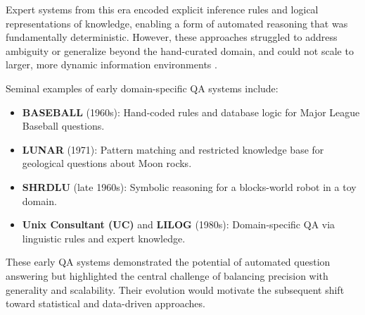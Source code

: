 \begin{spacing}{1.5}
Expert systems from this era encoded explicit inference rules and logical representations of knowledge, enabling a form of automated reasoning that was fundamentally deterministic. However, these approaches struggled to address ambiguity or generalize beyond the hand-curated domain, and could not scale to larger, more dynamic information environments \citep{noauthor_question_2025, jurafsky_chapter_2024}.

Seminal examples of early domain-specific QA systems include:
\begin{itemize}
    \item \textbf{BASEBALL} (1960s): Hand-coded rules and database logic for Major League Baseball questions.
    \item \textbf{LUNAR} (1971): Pattern matching and restricted knowledge base for geological questions about Moon rocks.
    \item \textbf{SHRDLU} (late 1960s): Symbolic reasoning for a blocks-world robot in a toy domain.
    \item \textbf{Unix Consultant (UC)} and \textbf{LILOG} (1980s): Domain-specific QA via linguistic rules and expert knowledge.
\end{itemize}
\citep{jurafsky_chapter_2024, antoniou_survey_2022}

These early QA systems demonstrated the potential of automated question answering but highlighted the central challenge of balancing precision with generality and scalability. Their evolution would motivate the subsequent shift toward statistical and data-driven approaches.


\end{spacing}
